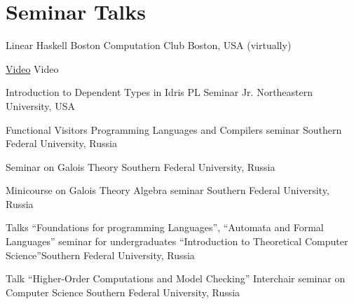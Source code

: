 \documentclass[11pt,a4paper]{moderncv}   %
\newcommand{\MyHrefImpl}[2]{%
\textcolor{blue}{\href{#1}{#2}}}
\def\LINKS{}
\newcommand*{\myhref}[2]{%
\ignorespaces%
\ifdefined\LINKS%
\MyHrefImpl{#1}{#2}%
\else%
#2%
\fi%
}
\begin{document}
\section{Seminar Talks}
{\footnotesize

    {Linear Haskell}
    {Boston Computation Club}{}
    {Boston, USA (virtually)}
    {%
    \myhref{https://youtu.be/ODjWURRRjxA}{Video}
    }

    {Introduction to Dependent Types in Idris}
    {PL Seminar Jr.}{}
    {Northeastern University, USA}
    {}


    {Functional Visitors}
    {Programming Languages and Compilers seminar}{}
    {Southern Federal University, Russia}
    {%
    }

    {Seminar on Galois Theory}{}
    {Southern Federal University, Russia}
    {%
    }{}

    {Minicourse on Galois Theory}
    {Algebra seminar}
    {Southern Federal University, Russia}{}{}

%
    {Talks “Foundations for programming Languages”, “Automata and Formal Languages”}%
    {seminar for undergraduates “Introduction to Theoretical Computer Science”}{Southern Federal University, Russia}{}%
    {%
    }

    {Talk “Higher-Order Computations and Model Checking”}
    {Interchair seminar on Computer Science}
    {Southern Federal University, Russia}{}%
    {%
    }

}
\end{document}
